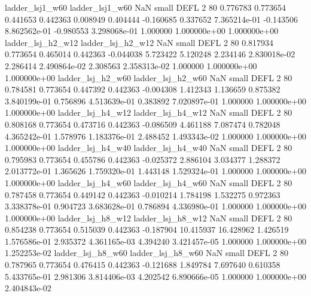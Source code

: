          ladder_lsj1_w60          ladder_lsj1_w60                   NaN      small     DEFL                 2 80 0.776783       0.773654 0.441653       0.442363    0.008949      0.404444     -0.160685     0.337652   7.365214e-01 -0.143506 8.862562e-01    -0.980553   3.298068e-01            1.000000    1.000000e+00        1.000000e+00
       ladder_lsj_h2_w12        ladder_lsj_h2_w12                   NaN      small     DEFL                 2 80 0.817934       0.773654 0.465014       0.442363   -0.044038      5.723422      5.120248     2.234146   2.830018e-02  2.286414 2.490864e-02     2.308563   2.358313e-02            1.000000    1.000000e+00        1.000000e+00
       ladder_lsj_h2_w60        ladder_lsj_h2_w60                   NaN      small     DEFL                 2 80 0.784581       0.773654 0.447392       0.442363   -0.004308      1.412343      1.136659     0.875382   3.840199e-01  0.756896 4.513639e-01     0.383892   7.020897e-01            1.000000    1.000000e+00        1.000000e+00
       ladder_lsj_h4_w12        ladder_lsj_h4_w12                   NaN      small     DEFL                 2 80 0.808168       0.773654 0.473716       0.442363   -0.086509      4.461188      7.087474     0.782048   4.365242e-01  1.578976 1.183376e-01     2.488452   1.493343e-02            1.000000    1.000000e+00        1.000000e+00
       ladder_lsj_h4_w40        ladder_lsj_h4_w40                   NaN      small     DEFL                 2 80 0.795983       0.773654 0.455786       0.442363   -0.025372      2.886104      3.034377     1.288372   2.013772e-01  1.365626 1.759320e-01     1.443148   1.529324e-01            1.000000    1.000000e+00        1.000000e+00
       ladder_lsj_h4_w60        ladder_lsj_h4_w60                   NaN      small     DEFL                 2 80 0.787458       0.773654 0.449142       0.442363   -0.010214      1.784198      1.532275     0.972363   3.338378e-01  0.904723 3.683628e-01     0.786894   4.336980e-01            1.000000    1.000000e+00        1.000000e+00
       ladder_lsj_h8_w12        ladder_lsj_h8_w12                   NaN      small     DEFL                 2 80 0.854238       0.773654 0.515039       0.442363   -0.187904     10.415937     16.428962     1.426519   1.576586e-01  2.935372 4.361165e-03     4.394240   3.421457e-05            1.000000    1.000000e+00        1.252253e-02
       ladder_lsj_h8_w60        ladder_lsj_h8_w60                   NaN      small     DEFL                 2 80 0.787965       0.773654 0.476415       0.442363   -0.121688      1.849784      7.697640     0.610358   5.433765e-01  2.981306 3.814406e-03     4.202542   6.890666e-05            1.000000    1.000000e+00        2.404843e-02
